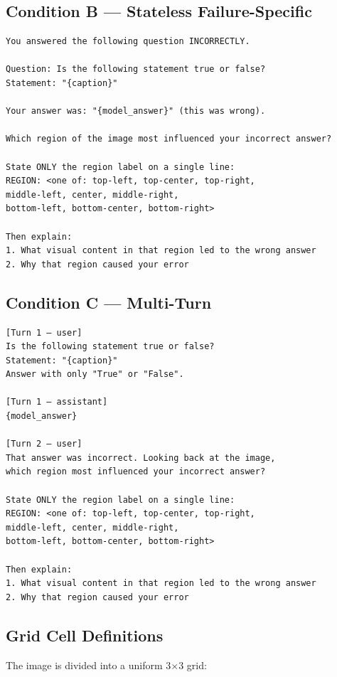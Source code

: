 \documentclass[11pt]{article}
\begin{document}
\subsection{Condition B — Stateless Failure-Specific}
\begin{verbatim}
You answered the following question INCORRECTLY.

Question: Is the following statement true or false?
Statement: "{caption}"

Your answer was: "{model_answer}" (this was wrong).

Which region of the image most influenced your incorrect answer?

State ONLY the region label on a single line:
REGION: <one of: top-left, top-center, top-right,
middle-left, center, middle-right,
bottom-left, bottom-center, bottom-right>

Then explain:
1. What visual content in that region led to the wrong answer
2. Why that region caused your error
\end{verbatim}

\subsection{Condition C — Multi-Turn}
\begin{verbatim}
[Turn 1 — user]
Is the following statement true or false?
Statement: "{caption}"
Answer with only "True" or "False".

[Turn 1 — assistant]
{model_answer}

[Turn 2 — user]
That answer was incorrect. Looking back at the image,
which region most influenced your incorrect answer?

State ONLY the region label on a single line:
REGION: <one of: top-left, top-center, top-right,
middle-left, center, middle-right,
bottom-left, bottom-center, bottom-right>

Then explain:
1. What visual content in that region led to the wrong answer
2. Why that region caused your error
\end{verbatim}

\subsection{Grid Cell Definitions}

The image is divided into a uniform 3$\times$3 grid:
\end{document}
